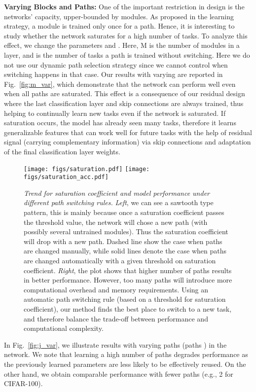 \textbf{Varying Blocks and Paths:} 
 One of the important restriction in \ours{} design is the networks' capacity, upper-bounded by  modules. As proposed in the learning strategy, a module is trained only once for a path. Hence, it is interesting to study whether the network saturates for a high  number of tasks. To analyze this effect, we change the parameters  and . Here, M is the number of modules in a layer, and  is the number of tasks a path is trained without switching. Here we do not use our dynamic path selection strategy since we cannot control when switching happens in that case.
 Our results with varying  are reported in Fig.~\ref{fig:m_var}, which demonstrate that the network can perform well even when all paths are saturated. This effect is a consequence of our residual design where the last classification layer and skip connections are always trained, thus helping to continually learn new tasks even if the network is saturated. If saturation occurs, the model has already seen many tasks, therefore it learns generalizable features that can work well for future tasks with the help of residual signal (carrying complementary information) via skip connections and adaptation of the final classification layer weights.
 
 \begin{figure*}[t]
\center
\texttt{[image: figs/saturation.pdf]}\qquad
\texttt{[image: figs/saturation\_acc.pdf]}
\caption{\emph{Trend for saturation coefficient and model performance under different path switching rules.}  \emph{Left}, we can see a sawtooth type pattern, this is mainly because once a saturation coefficient passes the threshold value, the network will chose a new path (with possibly several untrained modules). Thus the saturation coefficient will drop with a new path. Dashed line show the case when paths are changed manually, while solid lines denote the case when paths are changed automatically with a given threshold on saturation coefficient. \emph{Right}, the plot shows that higher number of paths  results in better performance. However, too many paths will introduce more computational overhead and memory requirements. Using an automatic path switching rule (based on a threshold for saturation coefficient), our method finds the best place to switch to a new task, and therefore balance the trade-off between performance and computational complexity. }\label{fig:saturation} 
\end{figure*}
 
In Fig.~\ref{fig:j_var}, we illustrate results with varying paths (paths ) in the network. We note that learning a high number of paths degrades performance as the previously learned parameters are less likely to be effectively reused. On the other hand, we obtain comparable performance with fewer paths (e.g., 2 for CIFAR-100).

